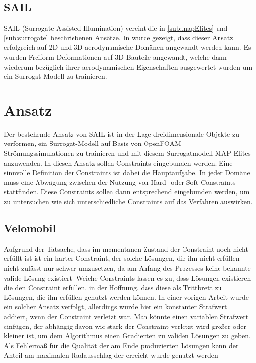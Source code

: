 \documentclass[12pt]{article}
\begin{document}
\subsection{SAIL}

SAIL (Surrogate-Assisted Illumination) vereint die in \ref{sub:mapElites} und \ref{sub:surrogate} beschriebenen Ansätze.
In \cite{Gaier.6152018} wurde gezeigt, dass dieser Ansatz erfolgreich auf 2D und 3D aerodynamische Domänen angewandt werden kann.
Es wurden Freiform-Deformationen auf 3D-Bauteile angewandt, welche dann wiederum bezüglich ihrer aerodynamischen Eigenschaften ausgewertet wurden um ein Surrogat-Modell zu trainieren.

\section{Ansatz}

Der bestehende Ansatz von SAIL ist in der Lage dreidimensionale Objekte zu verformen, ein Surrogat-Modell auf Basis von OpenFOAM \cite{OpenCFD.} Strömungssimulationen zu trainieren und mit diesem Surrogatmodell MAP-Elites anzuwenden. 
In diesen Ansatz sollen Constraints eingebunden werden.
Eine sinnvolle Definition der Constraints ist dabei die Hauptaufgabe.
In jeder Domäne muss eine Abwägung zwischen der Nutzung von Hard- oder Soft Constraints stattfinden.
Diese Constraints sollen dann entsprechend eingebunden werden, um zu untersuchen wie sich unterschiedliche Constraints auf das Verfahren auswirken.



\subsection{Velomobil}
Aufgrund der Tatsache, dass im momentanen Zustand der Constraint noch nicht erfüllt ist ist ein harter Constraint, der solche Lösungen, die ihn nicht erfüllen nicht zulässt nur schwer umzusetzen, da am Anfang des Prozesses keine bekannte valide Lösung existiert.
Weiche Constraints lassen es zu, dass Lösungen existieren die den Constraint erfüllen, in der Hoffnung, dass diese als Trittbrett zu Lösungen, die ihn erfüllen genutzt werden können.
In einer vorigen Arbeit wurde ein solcher Ansatz verfolgt, allerdings wurde hier ein konstanter Strafwert addiert, wenn der Constraint verletzt war.
Man könnte einen variablen Strafwert einfügen, der abhängig davon wie stark der Constraint verletzt wird größer oder kleiner ist, um dem Algorithmus einen Gradienten zu validen Lösungen zu geben.
Als Fehlermaß für die Qualität der am Ende produzierten Lösungen kann der Anteil am maximalen Radausschlag der erreicht wurde genutzt werden.
\end{document}
